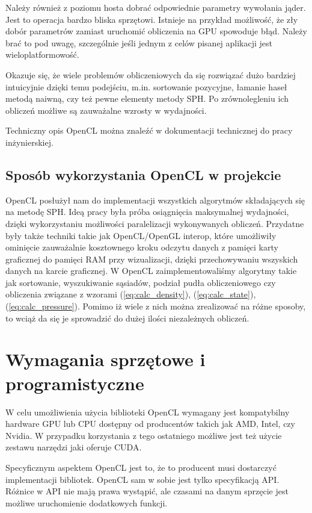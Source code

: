 \documentclass[polish, 12pt]{aghthesis}
\begin{document}
			Należy również z poziomu hosta dobrać odpowiednie parametry wywołania jąder. Jest to operacja bardzo bliska sprzętowi. Istnieje na przykład możliwość, że zły dobór parametrów zamiast uruchomić obliczenia na GPU spowoduje błąd. Należy brać to pod uwagę, szczególnie jeśli jednym z celów pisanej aplikacji jest wieloplatformowość.
			
			Okazuje się, że wiele problemów obliczeniowych da się rozwiązać dużo bardziej intuicyjnie dzięki temu podejściu, m.in. sortowanie pozycyjne, łamanie haseł metodą naiwną, czy też pewne elementy metody SPH. Po zrównolegleniu ich obliczeń możliwe są zauważalne wzrosty w wydajności. 
			
			Techniczny opis OpenCL można znaleźć w dokumentacji technicznej do pracy inżynierskiej.
		
		\subsection{Sposób wykorzystania OpenCL w projekcie}
			OpenCL posłużył nam do implementacji wszystkich algorytmów składających się na metodę SPH. Ideą pracy była próba osiągnięcia maksymalnej wydajności, dzięki wykorzystaniu możliwości paralelizacji wykonywanych obliczeń. Przydatne były także techniki takie jak OpenCL/OpenGL interop, które umożliwiły ominięcie zauważalnie kosztownego kroku odczytu danych z pamięci karty graficznej do pamięci RAM przy wizualizacji, dzięki przechowywaniu wszyskich danych na karcie graficznej. W OpenCL zaimplementowaliśmy algorytmy takie jak sortowanie, wyszukiwanie sąsiadów, podział pudła obliczeniowego czy obliczenia związane z wzorami (\ref{eq:calc_density}), (\ref{eq:calc_state}), (\ref{eq:calc_pressure}). Pomimo iż wiele z nich można zrealizować na różne sposoby, to wciąż da się je sprowadzić do dużej ilości niezależnych obliczeń.
			
	\section{Wymagania sprzętowe i programistyczne}
		W celu umożliwienia użycia biblioteki OpenCL wymagany jest kompatybilny hardware GPU lub CPU dostępny od producentów takich jak AMD, Intel, czy Nvidia. W przypadku korzystania z tego ostatniego możliwe jest też użycie zestawu narzędzi jaki oferuje CUDA.
		
		Specyficznym aspektem OpenCL jest to, że to producent musi dostarczyć implementacji bibliotek. OpenCL sam w sobie jest tylko specyfikacją API. Różnice w API nie mają prawa wystąpić, ale czasami na danym sprzęcie jest możliwe uruchomienie dodatkowych funkcji.
		
\end{document}
